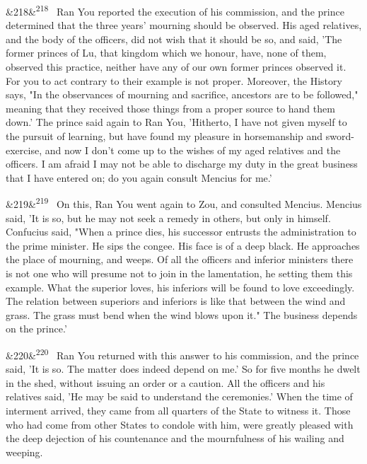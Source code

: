 \documentclass[12pt]{article}
\newcommand{\para}[1][]{\par\noindent\ifx&#1&\else\textsuperscript{\footnotesize #1}~\fi}
\begin{document}
\para[218] Ran You reported the execution of his commission, and the prince determined that the three years' mourning should be observed. His aged relatives, and the body of the officers, did not wish that it should be so, and said, 'The former princes of Lu, that kingdom which we honour, have, none of them, observed this practice, neither have any of our own former princes observed it. For you to act contrary to their example is not proper. Moreover, the History says, "In the observances of mourning and sacrifice, ancestors are to be followed," meaning that they received those things from a proper source to hand them down.' The prince said again to Ran You, 'Hitherto, I have not given myself to the pursuit of learning, but have found my pleasure in horsemanship and sword-exercise, and now I don't come up to the wishes of my aged relatives and the officers. I am afraid I may not be able to discharge my duty in the great business that I have entered on; do you again consult Mencius for me.'

\para[219] On this, Ran You went again to Zou, and consulted Mencius. Mencius said, 'It is so, but he may not seek a remedy in others, but only in himself. Confucius said, "When a prince dies, his successor entrusts the administration to the prime minister. He sips the congee. His face is of a deep black. He approaches the place of mourning, and weeps. Of all the officers and inferior ministers there is not one who will presume not to join in the lamentation, he setting them this example. What the superior loves, his inferiors will be found to love exceedingly. The relation between superiors and inferiors is like that between the wind and grass. The grass must bend when the wind blows upon it." The business depends on the prince.'

\para[220] Ran You returned with this answer to his commission, and the prince said, 'It is so. The matter does indeed depend on me.' So for five months he dwelt in the shed, without issuing an order or a caution. All the officers and his relatives said, 'He may be said to understand the ceremonies.' When the time of interment arrived, they came from all quarters of the State to witness it. Those who had come from other States to condole with him, were greatly pleased with the deep dejection of his countenance and the mournfulness of his wailing and weeping.
\end{document}
